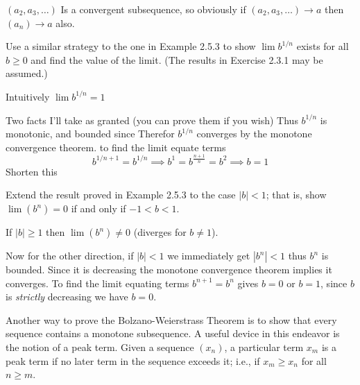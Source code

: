 \begin{solution}
  $(a_2, a_3, \dots)$ Is a convergent subsequence, so obviously if $(a_2, a_3, \dots) \to a$ then $(a_n) \to a$ also.
\end{solution}

\begin{exercise}
  Use a similar strategy to the one in Example 2.5.3 to show $\lim b^{1 / n}$ exists for all $b \geq 0$ and find the value of the limit. (The results in Exercise 2.3.1 may be assumed.)
\end{exercise}

\begin{solution}
  Intuitively $\lim b^{1/n} = 1$

  Two facts I'll take as granted (you can prove them if you wish)
  Thus $b^{1/n}$ is monotonic, and bounded since
  Therefor $b^{1/n}$ converges by the monotone convergence theorem. to find the limit equate terms
  $$
  b^{1/{n+1}} = b^{1/n} \implies b^1 = b^{\frac{n+1}{n}} = b^2 \implies b=1
  $$
  \TODO Shorten this
\end{solution}

\begin{exercise}
  Extend the result proved in Example 2.5.3 to the case $|b|<1$; that is, show $\lim \left(b^{n}\right)=0$ if and only if $-1<b<1$.
\end{exercise}

\begin{solution}
  If $|b| \ge 1$ then $\lim (b^n) \ne 0$ (diverges for $b \ne 1$).

  Now for the other direction, if $|b| < 1$ we immediately get $|b^n| < 1$ thus $b^n$ is bounded.
  Since it is decreasing the monotone convergence theorem implies it converges.
  To find the limit equating terms $b^{n+1} = b^{n}$ gives $b = 0$ or $b = 1$, since $b$ is \emph{strictly} decreasing we have $b = 0$.
\end{solution}

\begin{exercise}
  Another way to prove the Bolzano-Weierstrass Theorem is to show that every sequence contains a monotone subsequence. A useful device in this endeavor is the notion of a peak term. Given a sequence $\left(x_{n}\right)$, a particular term $x_{m}$ is a peak term if no later term in the sequence exceeds it; i.e., if $x_{m} \geq x_{n}$ for all $n \geq m$.
\end{exercise}

